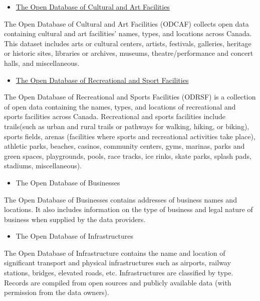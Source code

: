 \documentclass[
11pt, %
oneside, %
english, %
singlespacing, %
]{macthesis} %
\def\tightlist{}
\begin{document}
\begin{itemize}
\tightlist
\item
  \href{https://www.statcan.gc.ca/en/lode/databases/odcaf}{The Open Database of Cultural and Art Facilities}
\end{itemize}

The Open Database of Cultural and Art Facilities (ODCAF) collects open data containing cultural and art facilities' names, types, and locations across Canada. This dataset includes arts or cultural centers, artists, festivals, galleries, heritage or historic sites, libraries or archives, museums, theatre/performance and concert halls, and miscellaneous.

\begin{itemize}
\tightlist
\item
  \href{https://www.statcan.gc.ca/en/lode/databases/odrsf}{The Open Database of Recreational and Sport Facilities}
\end{itemize}

The Open Database of Recreational and Sports Facilities (ODRSF) is a collection of open data containing the names, types, and locations of recreational and sports facilities across Canada. Recreational and sports facilities include trails(such as urban and rural trails or pathways for walking, hiking, or biking), sports fields, arenas (facilities where sports and recreational activities take place), athletic parks, beaches, casinos, community centers, gyms, marinas, parks and green spaces, playgrounds, pools, race tracks, ice rinks, skate parks, splash pads, stadiums, miscellaneous).

\begin{itemize}
\tightlist
\item
  The Open Database of Businesses
\end{itemize}

The Open Database of Businesses contains addresses of business names and locations. It also includes information on the type of business and legal nature of business when supplied by the data providers.

\begin{itemize}
\tightlist
\item
  The Open Database of Infrastructures
\end{itemize}

The Open Database of Infrastructure contains the name and location of significant transport and physical infrastructures such as airports, railway stations, bridges, elevated roads, etc. Infrastructures are classified by type. Records are compiled from open sources and publicly available data (with permission from the data owners).
\end{document}
